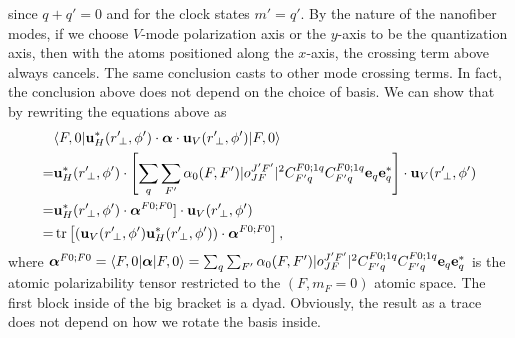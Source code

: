 \documentclass[preprint,aps,pra,onecolumn]{revtex4-1} %
\renewcommand{\tensor}[1]{\boldsymbol{#1}}
\begin{document}
since $q+q' = 0$ and for the clock states $m' = q'$. By the nature of the nanofiber modes, if we choose 
$V$-mode polarization axis or the $y$-axis to be the quantization axis, then with the atoms positioned 
along the $x$-axis, the crossing term above always cancels. The same conclusion casts to other mode crossing 
terms. In fact, the conclusion above does not depend on the choice of basis. We can show that by 
rewriting the equations above as
\begin{align}
&\bra{F,0} \mathbf{u}^*_H(r^\prime\!_\perp, \phi') \cdot \tensor{\alpha} \cdot 
	\mathbf{u}_{V}(r^\prime\!_\perp, \phi') \ket{F,0}\nonumber\\
=& \mathbf{u}^*_H(r^\prime\!_\perp, 
 \phi')\cdot \left[  \sum_{q} \sum_{F'}\alpha_0(F,F') 
   |o^{J'F'}_{JF} |^2 C^{F 	0;1q}_{F' q} C^{F 0;1q}_{F' q}
     	  \mathbf{e}_q \mathbf{e}^*_{q}  \right]\cdot \mathbf{u}_V(r^\prime\!_\perp, \phi') \\
=& \mathbf{u}^*_H(r^\prime\!_\perp,  \phi')\cdot \boldsymbol{\alpha}^{F0;F0}]\cdot 
\mathbf{u}_V(r^\prime\!_\perp, \phi') \\
=& \tr\left[ \left(  \mathbf{u}_V(r^\prime\!_\perp, \phi')  \mathbf{u}^*_H(r^\prime\!_\perp,  \phi')\right)
\cdot  \boldsymbol{\alpha}^{F0;F0} \right],
\end{align}
where $  \boldsymbol{\alpha}^{F0;F0} = \langle{F,0}\rvert\boldsymbol{\alpha}\lvert{F,0}\rangle = \sum_{q} 
\sum_{F'}\alpha_0(F,F') 
   |o^{J'F'}_{JF} |^2 C^{F 	0;1q}_{F' q} C^{F 0;1q}_{F' q}
     	  \mathbf{e}_q \mathbf{e}^*_{q} $ is the atomic 
polarizability tensor restricted to the $ (F,m_F=0) $ atomic space. The first block inside of the big bracket 
is a dyad. Obviously, the result as a trace does not depend on how we rotate the basis inside. 
 
\end{document}
